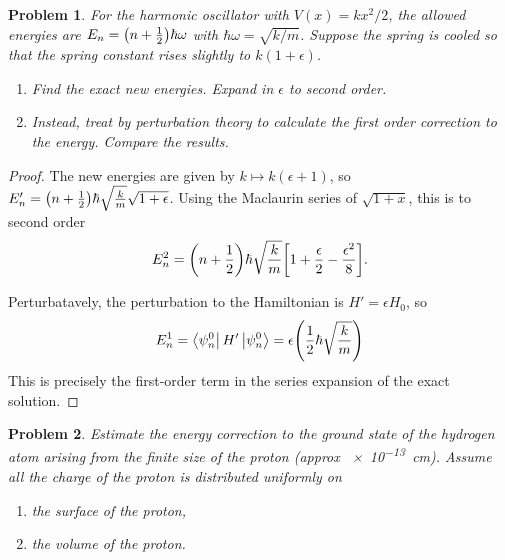 \documentclass{article}
\newtheorem{plm}{Problem}
\begin{document}
\begin{plm}
  For the harmonic oscillator with $V(x) = kx^{2}/2$, the allowed energies are $E_{n} = \qty(n + \frac{1}{2})\hbar\omega$
  with $\hbar\omega = \sqrt{k / m}$.
  Suppose the spring is cooled so that the spring constant rises slightly to $k(1 + \epsilon)$.
  \begin{enumerate}
  \item Find the exact new energies.
    Expand in $\epsilon$ to second order.
  \item Instead, treat by perturbation theory to calculate the first order correction to the energy.
    Compare the results.
  \end{enumerate}
\end{plm}

\begin{proof}
  The new energies are given by $k \mapsto k(\epsilon + 1)$, so $E_{n}' = \qty(n + \frac{1}{2})\hbar\sqrt{\frac{k}{m}}\sqrt{1 + \epsilon}$.
  Using the Maclaurin series of $\sqrt{1 + x}$, this is to second order
  \[
    E_{n}^{2} = \qty(n + \frac{1}{2})\hbar\sqrt{\frac{k}{m}}\qty[1 + \frac{\epsilon}{2} - \frac{\epsilon^{2}}{8}].
  \]

  Perturbatavely, the perturbation to the Hamiltonian is $H' = \epsilon H_{0}$, so
  \[
    E_{n}^{1} = \bra{\psi_{n}^{0}} H' \ket{\psi_{n}^{0}} = \epsilon\qty(\frac{1}{2}\hbar\sqrt{\frac{k}{m}})
  \]
  This is precisely the first-order term in the series expansion of the exact solution.
\end{proof}

\begin{plm}
  Estimate the energy correction to the ground state of the hydrogen atom arising from the finite size of the proton (approx \SI{e-13}{cm}).
  Assume all the charge of the proton is distributed uniformly on
  \begin{enumerate}
  \item the surface of the proton,
  \item the volume of the proton.
  \end{enumerate}
\end{plm}
\end{document}
